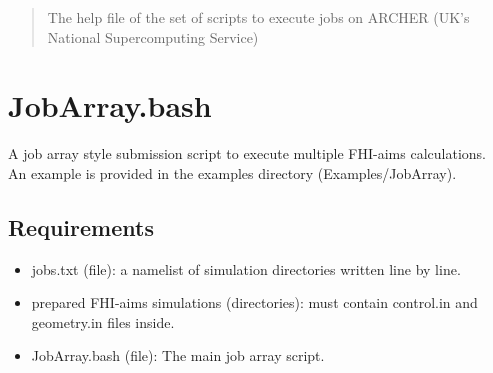 \documentclass[12pt]{article}
\begin{document}
\maketitle

\begin{abstract}
The help file of the set of scripts to execute jobs on ARCHER (UK's National Supercomputing Service)
\end{abstract}

\section{JobArray.bash}

A job array style submission script to execute multiple FHI-aims calculations. \\

\noindent An example is provided in the examples directory (Examples/JobArray).

\subsection{Requirements}

\begin{itemize}
  \item jobs.txt (file): a namelist of simulation directories written line by line.
  \item prepared FHI-aims simulations (directories): must contain control.in and geometry.in files inside.
  \item JobArray.bash (file): The main job array script. 
  
\end{itemize}
\end{document}
